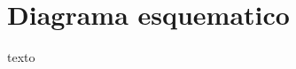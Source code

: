 \documentclass[../main.tex]{subfiles}
\begin{document}
\section{Diagrama esquematico}
texto
\end{document}
